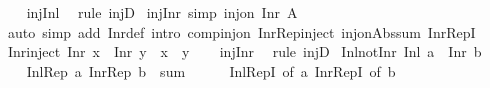 \begin{isabellebody}
%
\isadelimproof
\ \ %
\endisadelimproof
%
\isatagproof
{}\isamarkupfalse%
\ inj{\isacharunderscore}{\kern0pt}Inl\ \isamarkupfalse%
\ {\isacharparenleft}{\kern0pt}rule\ injD{\isacharparenright}{\kern0pt}%
\endisatagproof
{\isafoldproof}%
%
\isadelimproof
\isanewline
%
\endisadelimproof
\isanewline
{}\isamarkupfalse%
\ inj{\isacharunderscore}{\kern0pt}Inr\ {\isacharbrackleft}{\kern0pt}simp{\isacharbrackright}{\kern0pt}{\isacharcolon}{\kern0pt}\ {\isachardoublequoteopen}inj{\isacharunderscore}{\kern0pt}on\ Inr\ A{\isachardoublequoteclose}\isanewline
%
\isadelimproof
\ \ %
\endisadelimproof
%
\isatagproof
{}\isamarkupfalse%
\ {\isacharparenleft}{\kern0pt}auto\ simp\ add{\isacharcolon}{\kern0pt}\ Inr{\isacharunderscore}{\kern0pt}def\ intro{\isacharbang}{\kern0pt}{\isacharcolon}{\kern0pt}\ comp{\isacharunderscore}{\kern0pt}inj{\isacharunderscore}{\kern0pt}on\ Inr{\isacharunderscore}{\kern0pt}Rep{\isacharunderscore}{\kern0pt}inject\ inj{\isacharunderscore}{\kern0pt}on{\isacharunderscore}{\kern0pt}Abs{\isacharunderscore}{\kern0pt}sum\ Inr{\isacharunderscore}{\kern0pt}RepI{\isacharparenright}{\kern0pt}%
\endisatagproof
{\isafoldproof}%
%
\isadelimproof
\isanewline
%
\endisadelimproof
\isanewline
{}\isamarkupfalse%
\ Inr{\isacharunderscore}{\kern0pt}inject{\isacharcolon}{\kern0pt}\ {\isachardoublequoteopen}Inr\ x\ {\isacharequal}{\kern0pt}\ Inr\ y\ {\isasymLongrightarrow}\ x\ {\isacharequal}{\kern0pt}\ y{\isachardoublequoteclose}\isanewline
%
\isadelimproof
\ \ %
\endisadelimproof
%
\isatagproof
{}\isamarkupfalse%
\ inj{\isacharunderscore}{\kern0pt}Inr\ \isamarkupfalse%
\ {\isacharparenleft}{\kern0pt}rule\ injD{\isacharparenright}{\kern0pt}%
\endisatagproof
{\isafoldproof}%
%
\isadelimproof
\isanewline
%
\endisadelimproof
\isanewline
{}\isamarkupfalse%
\ Inl{\isacharunderscore}{\kern0pt}not{\isacharunderscore}{\kern0pt}Inr{\isacharcolon}{\kern0pt}\ {\isachardoublequoteopen}Inl\ a\ {\isasymnoteq}\ Inr\ b{\isachardoublequoteclose}\isanewline
%
\isadelimproof
%
\endisadelimproof
%
\isatagproof
{}\isamarkupfalse%
\ {\isacharminus}{\kern0pt}\isanewline
\ \ \isamarkupfalse%
\ {\isachardoublequoteopen}{\isacharbraceleft}{\kern0pt}Inl{\isacharunderscore}{\kern0pt}Rep\ a{\isacharcomma}{\kern0pt}\ Inr{\isacharunderscore}{\kern0pt}Rep\ b{\isacharbraceright}{\kern0pt}\ {\isasymsubseteq}\ sum{\isachardoublequoteclose}\isanewline
\ \ \ \ \isamarkupfalse%
\ Inl{\isacharunderscore}{\kern0pt}RepI\ {\isacharbrackleft}{\kern0pt}of\ a{\isacharbrackright}{\kern0pt}\ Inr{\isacharunderscore}{\kern0pt}RepI\ {\isacharbrackleft}{\kern0pt}of\ b{\isacharbrackright}{\kern0pt}\ \isamarkupfalse%

\end{isabellebody}
